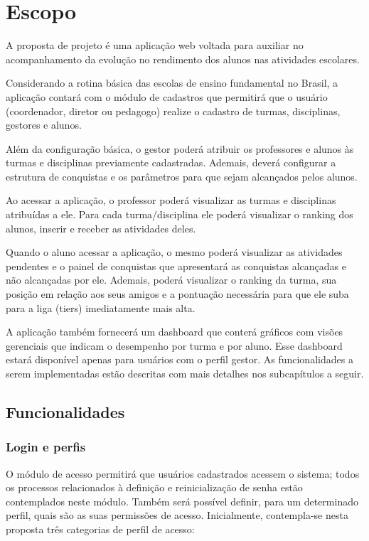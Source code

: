 \chapter{Escopo}
A proposta de projeto é uma aplicação web voltada para auxiliar no acompanhamento da evolução no rendimento dos alunos nas atividades escolares.

Considerando a rotina básica das escolas de ensino fundamental no Brasil, a aplicação contará com o módulo de cadastros que permitirá que o usuário (coordenador, diretor ou pedagogo) realize o cadastro de turmas, disciplinas, gestores e alunos.

Além da configuração básica, o gestor poderá atribuir os professores e alunos às turmas e disciplinas previamente cadastradas. Ademais, deverá configurar a estrutura de conquistas e os parâmetros para que sejam alcançados pelos alunos.

Ao acessar a aplicação, o professor poderá visualizar as turmas e disciplinas atribuídas a ele. Para cada turma/disciplina ele poderá visualizar o ranking dos alunos, inserir e receber as atividades deles.

Quando o aluno acessar a aplicação, o mesmo poderá visualizar as atividades pendentes e o painel de conquistas que apresentará as conquistas alcançadas e não alcançadas por ele. Ademais, poderá visualizar o ranking da turma, sua posição em relação aos seus amigos e a pontuação necessária para que ele suba para a liga (tiers) imediatamente mais alta.

A aplicação também fornecerá um dashboard que conterá gráficos com visões gerenciais que indicam o desempenho por turma e por aluno. Esse dashboard estará disponível apenas para  usuários com o perfil gestor.
As funcionalidades a serem implementadas estão descritas com mais detalhes nos subcapítulos a seguir. 

\section{Funcionalidades}
\subsection{Login e perfis}
O módulo de acesso permitirá que usuários cadastrados acessem o sistema; todos os processos relacionados à definição e reinicialização de senha estão contemplados neste módulo. Também será possível definir, para um determinado perfil, quais são as suas permissões de acesso.
Inicialmente, contempla-se nesta proposta três categorias de perfil de acesso: 

